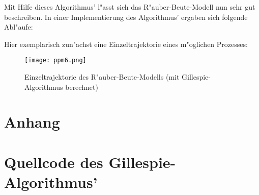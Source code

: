 \documentclass[11pt]{article}
\begin{document}
Mit Hilfe dieses Algorithmus' l"asst sich das R"auber-Beute-Modell nun sehr gut beschreiben. In einer Implementierung des Algorithmus' ergaben sich folgende Abl"aufe:

Hier exemplarisch zun"achst eine Einzeltrajektorie eines m"oglichen Prozesses:

\begin{figure}
\caption{Einzeltrajektorie des R"auber-Beute-Modells (mit Gillespie-Algorithmus berechnet)}
\texttt{[image: ppm6.png]}
\end{figure}

\section{Anhang}
\section{Quellcode des Gillespie-Algorithmus'}
\end{document}
